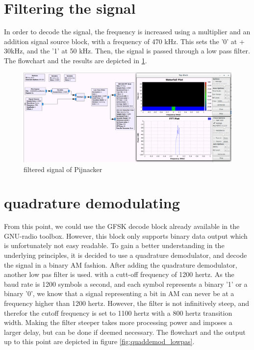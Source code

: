 \section{Filtering the signal} 
In order to decode the signal, the frequency is increased using a multiplier and an addition signal source block, with a frequency of 470 kHz. This sets the '0' at + 30kHz, and the '1' at 50 kHz. Then, the signal is passed through a low pass filter. The flowchart and the results are depicted in \ref{fig:buenos_isolated}.

\begin{figure}[ht]
\centering
\includegraphics[width=1\linewidth]{figures/buenos_isolated}
\caption{filtered signal of Pijnacker}
\label{fig:buenos_isolated}
\end{figure}

\section{quadrature demodulating}
From this point, we could use the GFSK decode block already available in the GNU-radio toolbox. However, this block only supports binary data output which is unfortunately not easy readable. To gain a better understanding in the underlying principles, it is decided to use a quadrature demodulator, and decode the signal in a binary AM fashion. After adding the quadrature demodulator, another low pas filter is used. with a cutt-off frequency of 1200 hertz. As the baud rate is 1200 symbols a second, and each symbol represents a binary '1' or a binary '0', we know that a signal representing a bit in AM can never be at a frequency higher than 1200 hertz. However, the filter is not infinitively steep, and therefor the cutoff frequency is set to 1100 hertz with a 800 hertz transition width. Making the filter steeper takes more processing power and imposes a larger delay, but can be done if deemed necessary. The flowchart and the output up to this point are depicted in figure \ref{fig:quaddemod_lowpas}. 

